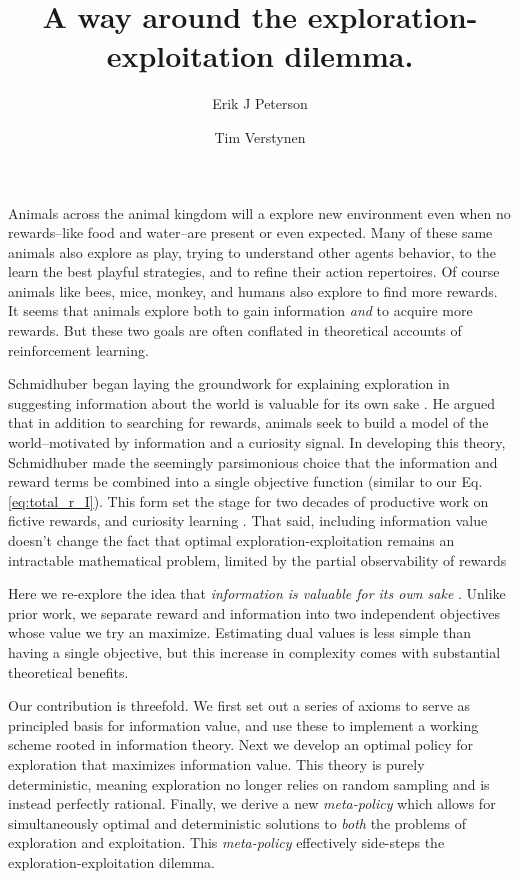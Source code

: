 \documentclass[9pt,twocolumn,twoside]{pnas-new}
\title{A way around the exploration-exploitation dilemma.}
\author[a,1]{Erik J Peterson}
\author[a,b]{Tim Verstynen}
\affil[a]{Department of Psychology}
\affil[b]{Center for the Neural Basis of Cognition, Carnegie Mellon University, Pittsburgh PA}
\begin{document}
\verticaladjustment{-2pt}
\maketitle

\thispagestyle{firststyle}
Animals across the animal kingdom will a explore new environment even when no rewards--like food and water--are present or even expected. Many of these same animals also explore as play, trying to understand other agents behavior, to the learn the best playful strategies, and to refine their action repertoires. Of course animals like bees, mice, monkey, and humans also explore to find more rewards. It seems that animals explore both to gain information \textit{and} to acquire more rewards. But these two goals are often conflated in theoretical accounts of reinforcement learning.

Schmidhuber began laying the groundwork for explaining exploration in suggesting information about the world is valuable for its own sake \cite{Schmidhuber1991}. He argued that in addition to searching for rewards, animals seek to build a model of the world--motivated by information and a curiosity signal. In developing this theory, Schmidhuber made the seemingly parsimonious choice that the information and reward terms be combined into a single objective function (similar to our Eq.\ref{eq:total_r_I}). This form set the stage for two decades of productive work on fictive rewards, and curiosity learning \cite{Pathak2017,Sutton1990,dayan1996exploration,TODO}. That said, including information value doesn't change the fact that optimal exploration-exploitation remains an intractable mathematical problem, limited by the partial observability of rewards \cite{thrun1992active,dayan1996exploration,findling2018computational,gershman2018deconstructing} 

 Here we re-explore the idea that \textit{information is valuable for its own sake} \cite{Schmidhuber1991}. Unlike prior work, we separate reward and information into two independent objectives whose value we try an maximize. Estimating dual values is less simple than having a single objective, but this increase in complexity comes with substantial theoretical benefits.

Our contribution is threefold. We first set out a series of axioms to serve as principled basis for information value, and use these to implement a working scheme rooted in information theory. Next we develop an optimal policy for exploration that maximizes information value. This theory is purely deterministic, meaning exploration no longer relies on random sampling and is instead perfectly rational. Finally, we derive a new \textit{meta-policy} which allows for simultaneously optimal and deterministic solutions to \textit{both} the problems of exploration and exploitation. This \textit{meta-policy} effectively side-steps the exploration-exploitation dilemma.
\end{document}

